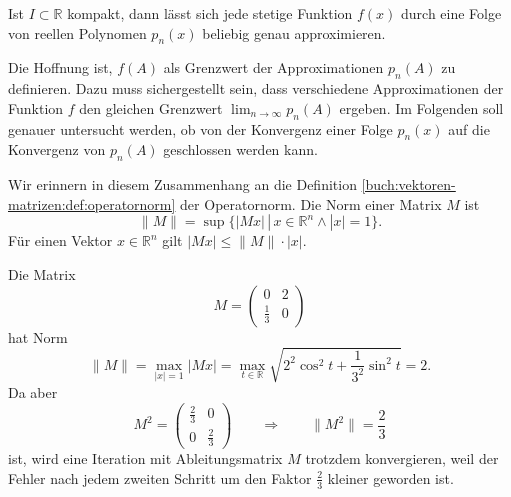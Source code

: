 \begin{satz}
Ist $I\subset\mathbb{R}$ kompakt, dann lässt sich jede stetige Funktion
$f(x)$
durch eine Folge von reellen Polynomen
$p_n(x)$ beliebig genau approximieren.
\end{satz}

Die Hoffnung ist, $f(A)$ als Grenzwert der Approximationen $p_n(A)$
zu definieren.
Dazu muss sichergestellt sein, dass verschiedene Approximationen
der Funktion $f$ den gleichen Grenzwert $\lim_{n\to\infty}p_n(A)$ 
ergeben.
Im Folgenden soll genauer untersucht werden, ob von der
Konvergenz einer Folge $p_n(x)$ auf die Konvergenz von $p_n(A)$
geschlossen werden kann.


Wir erinnern in diesem Zusammenhang an die Definition
\ref{buch:vektoren-matrizen:def:operatornorm}
der Operatornorm.
Die Norm einer Matrix $M$ ist
\[
\|M\|
=
\sup\{|Mx|\,|\, x\in\mathbb R^n\wedge |x|=1\}.
\]
Für einen Vektor $x\in\mathbb R^n$ gilt $|Mx| \le \|M\|\cdot |x|$.

\begin{beispiel}
Die Matrix
\[
M=\begin{pmatrix}
0&2\\
\frac13&0
\end{pmatrix}
\]
hat Norm
\[
\|M\|
=
\max_{|x|=1} |Mx| 
=
\max_{t\in\mathbb R} \sqrt{2^2\cos^2 t +\frac1{3^2}\sin^2t} = 2.
\]
Da aber
\[
M^2 = \begin{pmatrix}
\frac{2}{3}&0\\
0&\frac{2}{3}
\end{pmatrix}
\qquad\Rightarrow\qquad \|M^2\|=\frac23
\]
ist, wird eine Iteration mit Ableitungsmatrix $M$ trotzdem
konvergieren, weil der Fehler nach jedem zweiten Schritt um den
Faktor $\frac23$ kleiner geworden ist.
\end{beispiel}

